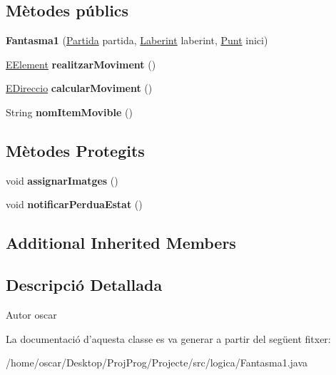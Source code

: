 \subsection*{Mètodes públics}
\begin{DoxyCompactItemize}
\item 
\hypertarget{classlogica_1_1_fantasma1_aee9773a1f660ba8c36da59caa79b36e9}{{\bfseries Fantasma1} (\hyperlink{classlogica_1_1_partida}{Partida} partida, \hyperlink{classlogica_1_1laberints_1_1_laberint}{Laberint} laberint, \hyperlink{classlogica_1_1_punt}{Punt} inici)}\label{classlogica_1_1_fantasma1_aee9773a1f660ba8c36da59caa79b36e9}

\item 
\hypertarget{classlogica_1_1_fantasma1_a7939910bab6bdc682b81b8cbb2d20826}{\hyperlink{enumlogica_1_1enumeracions_1_1_e_element}{E\+Element} {\bfseries realitzar\+Moviment} ()}\label{classlogica_1_1_fantasma1_a7939910bab6bdc682b81b8cbb2d20826}

\item 
\hypertarget{classlogica_1_1_fantasma1_ac0020a6fef6ca6779711c58f04d993fc}{\hyperlink{enumlogica_1_1enumeracions_1_1_e_direccio}{E\+Direccio} {\bfseries calcular\+Moviment} ()}\label{classlogica_1_1_fantasma1_ac0020a6fef6ca6779711c58f04d993fc}

\item 
\hypertarget{classlogica_1_1_fantasma1_ac013f39eb8452049f1c4449bd414fd79}{String {\bfseries nom\+Item\+Movible} ()}\label{classlogica_1_1_fantasma1_ac013f39eb8452049f1c4449bd414fd79}

\end{DoxyCompactItemize}
\subsection*{Mètodes Protegits}
\begin{DoxyCompactItemize}
\item 
\hypertarget{classlogica_1_1_fantasma1_a4e887e1e0151f5fd35a202b323879bb1}{void {\bfseries assignar\+Imatges} ()}\label{classlogica_1_1_fantasma1_a4e887e1e0151f5fd35a202b323879bb1}

\item 
\hypertarget{classlogica_1_1_fantasma1_affe46017be82b1f54e68c41364a69fe3}{void {\bfseries notificar\+Perdua\+Estat} ()}\label{classlogica_1_1_fantasma1_affe46017be82b1f54e68c41364a69fe3}

\end{DoxyCompactItemize}
\subsection*{Additional Inherited Members}


\subsection{Descripció Detallada}
\begin{DoxyAuthor}{Autor}
oscar 
\end{DoxyAuthor}


La documentació d'aquesta classe es va generar a partir del següent fitxer\+:\begin{DoxyCompactItemize}
\item 
/home/oscar/\+Desktop/\+Proj\+Prog/\+Projecte/src/logica/Fantasma1.\+java\end{DoxyCompactItemize}
